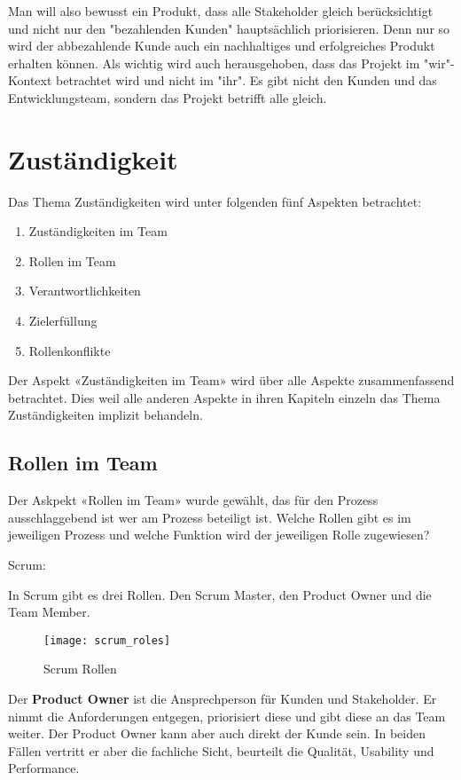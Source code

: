 Man will also bewusst ein Produkt, dass alle Stakeholder gleich berücksichtigt und nicht nur den "bezahlenden Kunden" hauptsächlich priorisieren. Denn nur so wird der abbezahlende Kunde auch ein nachhaltiges und erfolgreiches Produkt erhalten können.
\medskip
Als wichtig wird auch herausgehoben, dass das Projekt im "wir"-Kontext betrachtet wird und nicht im "ihr". Es gibt nicht den Kunden und das Entwicklungsteam, sondern das Projekt betrifft alle gleich.


\section{Zuständigkeit}

Das Thema Zuständigkeiten wird unter folgenden fünf Aspekten betrachtet:
\begin{enumerate}
\item Zuständigkeiten im Team
\item Rollen im Team
\item Verantwortlichkeiten
\item Zielerfüllung
\item Rollenkonflikte
\end{enumerate}

Der Aspekt «Zuständigkeiten im Team» wird über alle Aspekte zusammenfassend betrachtet. Dies weil alle anderen Aspekte in ihren Kapiteln einzeln das Thema Zuständigkeiten implizit behandeln.

\subsection{Rollen im Team}

Der Askpekt «Rollen im Team» wurde gewählt, das für den Prozess ausschlaggebend ist wer am Prozess beteiligt ist. Welche Rollen gibt es im jeweiligen Prozess und welche Funktion wird der jeweiligen Rolle zugewiesen?

{\Large Scrum:} \medskip

In Scrum gibt es drei Rollen. Den Scrum Master, den Product Owner und die Team Member. 
\begin{figure}[H]
	\centering
	\texttt{[image: scrum\_roles]}
	\caption{Scrum Rollen}
	\label{fig:scrumrollen}
\end{figure}

Der \textbf{Product Owner} ist die Ansprechperson für Kunden und Stakeholder. Er nimmt die Anforderungen entgegen, priorisiert diese und gibt diese an das Team weiter. Der Product Owner kann aber auch direkt der Kunde sein. In beiden Fällen vertritt er aber die fachliche Sicht, beurteilt die Qualität, Usability und Performance. \medskip

